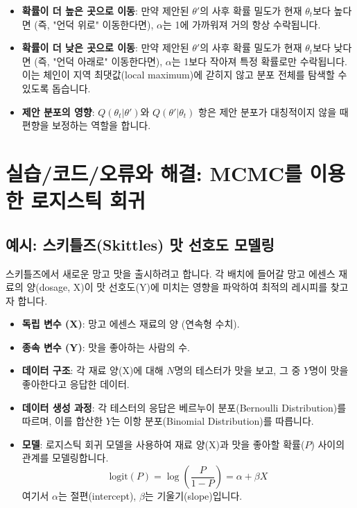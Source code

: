 \documentclass[11pt,a4paper]{article}
\theoremstyle{definition}
\newcommand{\newsection}[1]{\newpage\section{#1}}
\begin{document}
\begin{infobox}[title=수락 확률 $\alpha$의 직관적 의미]
\begin{itemize}
    \item \textbf{확률이 더 높은 곳으로 이동}: 만약 제안된 $\theta'$의 사후 확률 밀도가 현재 $\theta_t$보다 높다면 (즉, "언덕 위로" 이동한다면), $\alpha$는 1에 가까워져 거의 항상 수락됩니다.
    \item \textbf{확률이 더 낮은 곳으로 이동}: 만약 제안된 $\theta'$의 사후 확률 밀도가 현재 $\theta_t$보다 낮다면 (즉, "언덕 아래로" 이동한다면), $\alpha$는 1보다 작아져 특정 확률로만 수락됩니다. 이는 체인이 지역 최댓값(local maximum)에 갇히지 않고 분포 전체를 탐색할 수 있도록 돕습니다.
    \item \textbf{제안 분포의 영향}: $Q(\theta_t | \theta')$와 $Q(\theta' | \theta_t)$ 항은 제안 분포가 대칭적이지 않을 때 편향을 보정하는 역할을 합니다.
\end{itemize}
\end{infobox}

\newsection{실습/코드/오류와 해결: MCMC를 이용한 로지스틱 회귀}

\subsection*{예시: 스키틀즈(Skittles) 맛 선호도 모델링}
스키틀즈에서 새로운 망고 맛을 출시하려고 합니다. 각 배치에 들어갈 망고 에센스 재료의 양(dosage, X)이 맛 선호도(Y)에 미치는 영향을 파악하여 최적의 레시피를 찾고자 합니다.

\begin{infobox}[title=데이터 및 모델 설정]
\begin{itemize}
    \item \textbf{독립 변수 (X)}: 망고 에센스 재료의 양 (연속형 수치).
    \item \textbf{종속 변수 (Y)}: 맛을 좋아하는 사람의 수.
    \item \textbf{데이터 구조}: 각 재료 양(X)에 대해 $N$명의 테스터가 맛을 보고, 그 중 $Y$명이 맛을 좋아한다고 응답한 데이터.
    \item \textbf{데이터 생성 과정}: 각 테스터의 응답은 베르누이 분포(Bernoulli Distribution)를 따르며, 이를 합산한 $Y$는 이항 분포(Binomial Distribution)를 따릅니다.
    \item \textbf{모델}: 로지스틱 회귀 모델을 사용하여 재료 양(X)과 맛을 좋아할 확률($P$) 사이의 관계를 모델링합니다.
    \[ \text{logit}(P) = \log\left(\frac{P}{1-P}\right) = \alpha + \beta X \]
    여기서 $\alpha$는 절편(intercept), $\beta$는 기울기(slope)입니다.
\end{itemize}
\end{infobox}
\end{document}
